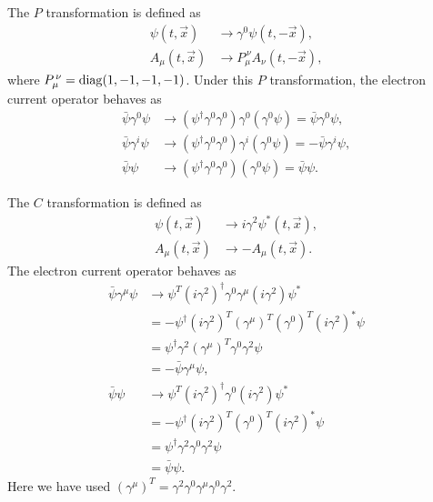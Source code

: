 \documentclass[11pt,a4paper]{article}
\begin{document}
The $P$ transformation is defined as
\begin{align}
    \psi(t,\vec x) &\to \gamma^0 \psi(t,-\vec x), \\
    A_\mu(t,\vec x) &\to P_{\mu}^{\,\nu} A_\nu(t, -\vec x),
\end{align}
where $P_{\mu}^{\,\nu} = {\rm diag}(1, -1, -1, -1)$. Under this $P$ transformation, the electron current operator behaves as
\begin{align}
    \bar\psi \gamma^0 \psi &\to (\psi^\dagger \gamma^0 \gamma^0) \gamma^0 (\gamma^0 \psi) = \bar\psi \gamma^0 \psi, \\
    \bar\psi \gamma^i \psi &\to (\psi^\dagger \gamma^0 \gamma^0) \gamma^i (\gamma^0 \psi) = -\bar\psi \gamma^i \psi, \\
    \bar\psi \psi &\to (\psi^\dagger \gamma^0 \gamma^0) (\gamma^0 \psi) = \bar\psi \psi.
\end{align}

The $C$ transformation is defined as
\begin{align}
    \psi(t,\vec x) &\to i \gamma^2 \psi^*(t, \vec x), \\
    A_\mu(t,\vec x) &\to -A_\mu(t, \vec x).
\end{align}
The electron current operator behaves as
\begin{align}
    \bar\psi \gamma^\mu \psi
    &\to \psi^T (i \gamma^2)^\dagger \gamma^0 \gamma^\mu (i \gamma^2) \psi^* \nonumber\\
    &= -\psi^\dagger (i\gamma^2)^T (\gamma^\mu)^T (\gamma^0)^T (i\gamma^2)^* \psi \nonumber\\
    &= \psi^\dagger \gamma^2 (\gamma^\mu)^T \gamma^0 \gamma^2 \psi \nonumber\\
    &= -\bar\psi \gamma^\mu \psi, \\
%
    \bar\psi \psi &\to \psi^T (i\gamma^2)^\dagger \gamma^0 (i\gamma^2) \psi^* \nonumber\\
    &= -\psi^\dagger (i\gamma^2)^T (\gamma^0)^T (i\gamma^2)^* \psi \nonumber\\
    &= \psi^\dagger \gamma^2 \gamma^0 \gamma^2 \psi\nonumber\\
    &= \bar\psi \psi.
\end{align}
Here we have used $(\gamma^\mu)^T = \gamma^2 \gamma^0 \gamma^\mu \gamma^0 \gamma^2$.
\end{document}
